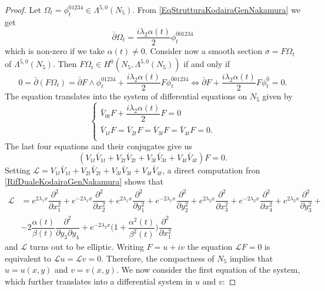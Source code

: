 \documentclass[10pt,a4paper]{amsart}
\newcommand{\delbar}{\bar{\partial}}
\newcommand{\del}{\partial}
\begin{document}
\begin{proof}
	Let $ \Omega_{t} = \phi_{t}^{01234} \in \Lambda^{5,0}(N_{5})$. From \eqref{EqStrutturaKodairaGenNakamura} we get
	\[ \delbar\Omega_{t} = \dfrac{i\lambda_{2}\alpha(t)}{2} \phi_{t}^{\bar 0 01234}\]
	which is non-zero if we take $ \alpha(t) \ne 0 $. Consider now a smooth section $ \sigma = F\Omega_{t} $ of $\Lambda^{5,0}(N_{5})  $. Then $ F\Omega_{t} \in H^{0}(N_{5}, \Lambda^{5,0}(N_{5})) $ if and only if
	\[ 0 = \delbar(F\Omega_{t}) = \delbar F \wedge  \phi_{t}^{01234}  +   \dfrac{i\lambda_{2}\alpha(t)}{2} F\phi_{t}^{\bar 0 01234} \iff \delbar F +   \dfrac{i\lambda_{2}\alpha(t)}{2} F\phi_{t}^{\bar 0} = 0.\]
	The equation translates into the system of differential equations on $ N_{5} $ given by
	\[ \begin{cases}
		\bar V_{0t}F +   \dfrac{i\lambda_{2}\alpha(t)}{2} F = 0 \\
		\bar V_{1t}F = \bar V_{2t}F = \bar V_{3t}F = \bar V_{4t}F = 0. \\
	\end{cases} \]
	The last four equations and their conjugates give us
	\[ (V_{1t}\bar V_{1t} + V_{2t}\bar V_{2t} + V_{3t}\bar V_{3t} + V_{4t}\bar V_{4t})F = 0. \]
	Setting $ \mathcal{L} =  V_{1t}\bar V_{1t} + V_{2t}\bar V_{2t} + V_{3t}\bar V_{3t} + V_{4t}\bar V_{4t}$, a direct computation fron \eqref{RifDualeKodairaGenNakamura} shows that
	\begin{equation*}
			\begin{split}
			\mathcal{L} & = e^{2\lambda_{1}x}\dfrac{\del^{2}}{\del x_{1}^{2}} + e^{-2\lambda_{1}x}\dfrac{\del^{2}}{\del x_{2}^{2}} + e^{2\lambda_{1}x}\dfrac{\del^{2}}{\del y_{1}^{2}} + e^{-2\lambda_{1}x}\dfrac{\del^{2}}{\del y_{2}^{2}} + e^{2\lambda_{2}x}\dfrac{\del^{2}}{\del x_{3}^{2}} + e^{-2\lambda_{2}x}\dfrac{\del^{2}}{\del x_{4}^{2}} + e^{2\lambda_{2}x}\dfrac{\del^{2}}{\del y_{3}^{2}} + \\
			& -2\dfrac{\alpha(t)}{\beta(t)}\dfrac{\del^{2}}{\del y_{3}\del y_{4}} + e^{-2\lambda_{2}x}\bigg(1 + \dfrac{\alpha^{2}(t)}{\beta^{2}(t)}\bigg)\dfrac{\del^{2}}{\del x_{1}^{2}}
		\end{split}
	\end{equation*}
	and $\mathcal{L}$ turns out to be elliptic. Writing $ F = u + iv $ the equation $ \mathcal{L}F = 0 $ is equivalent to $ \mathcal{L}u = \mathcal{L}v = 0 $. Therefore, the compactness of $ N_{5} $ implies that $ u = u(x,y)$ and $ v = v(x,y) $. We now consider the first equation of the system, which further translates into a differential system in $ u $ and $ v $:

\end{proof}
\end{document}
